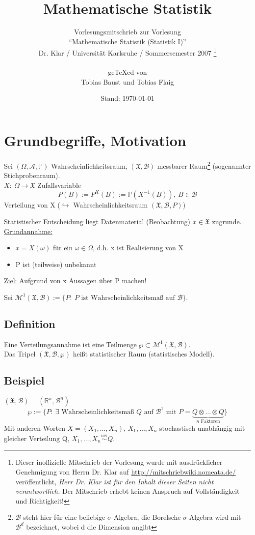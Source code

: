 \documentclass[a4paper,11pt,twoside,titlepage]{article}
\title{Mathematische Statistik}
\author{Vorlesungsmitschrieb zur Vorlesung\\ "`Mathematische Statistik (Statistik I)"'\\
Dr. Klar / Universität Karlsruhe / Sommersemester 2007
\footnote{
Dieser inoffizielle Mitschrieb der Vorlesung wurde mit ausdrücklicher Genehmigung von Herrn Dr. Klar auf \url{http://mitschriebwiki.nomeata.de/} veröffentlicht, \emph{Herr Dr. Klar ist für den Inhalt dieser Seiten nicht verantwortlich.} Der Mitschrieb erhebt keinen Anspruch auf Vollständigkeit und Richtigkeit!
}\\
~\\
ge\TeX ed von\\
Tobias Baust und Tobias Flaig}
\date{Stand: \today}
\newcommand{\R}{{\mathbb R}}
\newcommand{\PP}{{\mathbb P}} %
\newcommand{\XX}{{\mathfrak X}} %
\newcommand{\MM}{{\mathcal M}}
\newcommand\AAA{ \mathcal{A} } %
\newcommand\BB{ \mathcal{B} } %
\begin{document}
\setcounter{tocdepth}{1}
\renewcommand{\thepage}{\roman{page}}
\thispagestyle{empty}
\maketitle
\newpage
\thispagestyle{empty}
\tableofcontents
\thispagestyle{empty}
\cleardoublepage

\renewcommand{\thepage}{\arabic{page}}
\setcounter{page}{1}
\renewcommand{\thesection}{\arabic{section}}




\section{Grundbegriffe, Motivation}
Sei $(\Omega,\AAA,\PP)$ Wahrscheinlichkeitsraum, $(\XX,\BB)$ messbarer Raum\footnote{$\BB$ steht hier für eine beliebige $\sigma$-Algebra, die Borelsche $\sigma$-Algebra wird mit $\BB^d$ bezeichnet, wobei d die Dimension angibt} (sogenannter Stichprobenraum).\\
$X:\ \Omega\to\XX$ Zufallsvariable
\[P(B):=P^X(B):=\PP(X^{-1}(B)),\ B\in\BB\]
Verteilung von X ($\hookrightarrow$ Wahrscheinlichkeitsraum $(\XX,\BB,P)$)

Statistischer Entscheidung liegt Datenmaterial (Beobachtung) $x\in\XX$ zugrunde.\\
\underline{Grundannahme:}
\begin{itemize}
\item[1) ]$x=X(\omega)$ für ein $\omega\in\Omega$, d.h. x ist Realisierung von X
\item[2) ]P ist (teilweise) unbekannt
\end{itemize}
\underline{Ziel:} Aufgrund von x Aussagen über P machen!

Sei $\MM^1(\XX,\BB):=\{P:\ P\mbox{ ist Wahrscheinlichkeitsmaß auf }\BB\}$.

\subsection{Definition}
Eine Verteilungsannahme ist eine Teilmenge $\wp\subset\MM^1(\XX,\BB)$.\\
Das Tripel $(\XX,\BB,\wp)$ heißt statistischer Raum (statistisches Modell).

\subsection{Beispiel}
$(\XX,\BB)=(\R^n,\BB^n)$
\[\wp:=\{P:\ \exists\mbox{ Wahrscheinlichkeitsmaß } Q\mbox{ auf }\BB^1\mbox{ mit }P=\underbrace{Q\otimes\ldots\otimes Q}_{n\mbox{ Faktoren}}\}\]
Mit anderen Worten $X=(X_1,\ldots,X_n)$, $X_1,\ldots,X_n$ stochastisch unabhängig mit gleicher Verteilung Q, $X_1,\ldots,X_n\stackrel{\mbox{uiv}}{\sim}Q$.
\end{document}
